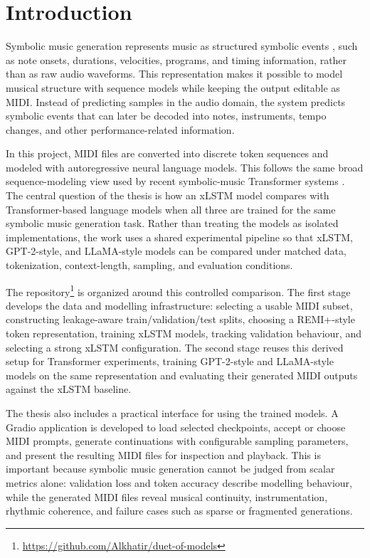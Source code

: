 \section{Introduction}

Symbolic music generation represents music as structured symbolic events
\citep{huangPopMusicTransformer2020,fradetMiditokPythonPackage2023}, such
as note onsets, durations, velocities, programs, and timing information, rather
than as raw audio waveforms. This representation makes it possible to model
musical structure with sequence models while keeping the output editable as MIDI.
Instead of predicting samples in the audio domain, the system predicts symbolic
events that can later be decoded into notes, instruments, tempo changes, and
other performance-related information.

In this project, MIDI files are converted into discrete token sequences and
modeled with autoregressive neural language models. This follows the same broad
sequence-modeling view used by recent symbolic-music Transformer systems
\citep{hsiaoCompoundWordTransformer2021,ensMMMExploringConditional2020}. The
central question of the thesis is how an xLSTM model compares with
Transformer-based language models when all three are trained for the same
symbolic music generation task. Rather than treating the models as isolated
implementations, the work uses a shared experimental pipeline so that xLSTM,
GPT-2-style, and LLaMA-style models can be compared under matched data,
tokenization, context-length, sampling, and evaluation conditions.

The repository\footnote{\url{https://github.com/Alkhatir/duet-of-models}} is
organized around this controlled comparison. The first stage develops the data
and modelling infrastructure: selecting a usable MIDI subset, constructing
leakage-aware train/validation/test splits, choosing a REMI+-style token
representation, training xLSTM models, tracking validation behaviour, and
selecting a strong xLSTM configuration. The second stage reuses this derived
setup for Transformer experiments, training GPT-2-style and LLaMA-style models
on the same representation and evaluating their generated MIDI outputs against
the xLSTM baseline.

The thesis also includes a practical interface for using the trained models. A
Gradio application is developed to load selected checkpoints, accept or choose
MIDI prompts, generate continuations with configurable sampling parameters, and
present the resulting MIDI files for inspection and playback. This is important
because symbolic music generation cannot be judged from scalar metrics alone:
validation loss and token accuracy describe modelling behaviour, while the
generated MIDI files reveal musical continuity, instrumentation, rhythmic
coherence, and failure cases such as sparse or fragmented generations.


